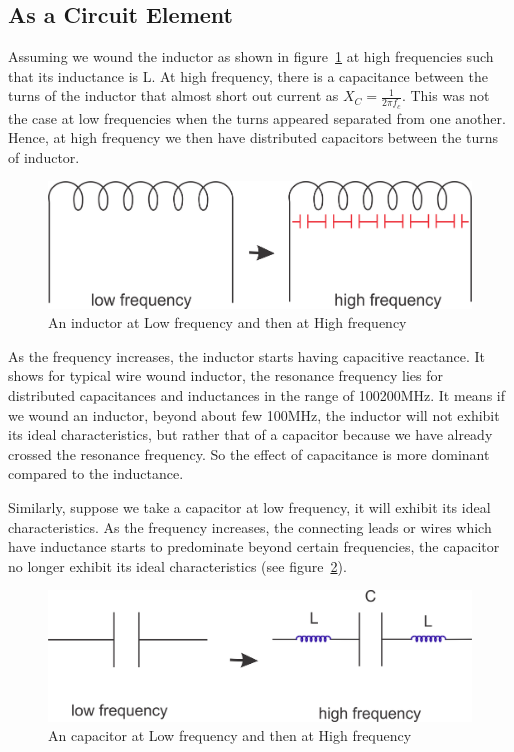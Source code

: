 \subsection{As a Circuit Element}\label{sec:circuitelement}
Assuming we wound the inductor as shown in figure~\ref{fig:group10diagram3} at high frequencies such that its inductance is L. At high frequency, there is a capacitance between the turns of the inductor that almost short out current as $X_{C} = \frac{1}{2\pi f_c}$. This was not the case at low frequencies when the turns appeared separated from one another. Hence, at high frequency we then have distributed capacitors between the turns of inductor.
\begin{figure}[h]
\centering
\includegraphics[width=1\linewidth]{./graphics/group10diagram3}
\caption{An inductor at Low frequency and then at High frequency}
\label{fig:group10diagram3}
\end{figure}

As the frequency increases, the inductor starts having capacitive reactance. It shows for typical wire wound inductor, the resonance frequency lies for distributed capacitances and inductances in the range of 100\textemdash\;200MHz. It means if we wound an inductor, beyond about few 100MHz, the inductor will not exhibit its ideal characteristics, but rather that of a capacitor because we have already crossed the resonance frequency. So the effect of capacitance is more dominant compared to the inductance.

Similarly, suppose we take a capacitor at low frequency, it will exhibit its ideal characteristics. As the frequency increases, the connecting leads or wires which have inductance starts to predominate beyond certain frequencies, the capacitor no longer exhibit its ideal characteristics (see figure~\ref{fig:group10diagram4}).
\begin{figure}[h]
\centering
\includegraphics[width=1\linewidth]{./graphics/group10diagram4}
\caption{An capacitor at Low frequency and then at High frequency}
\label{fig:group10diagram4}
\end{figure}

